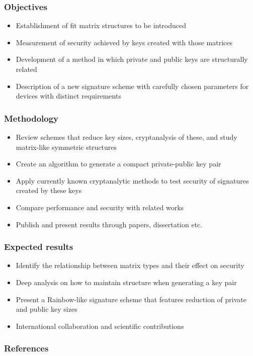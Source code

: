 \documentclass[12pt]{beamer}
\newcommand{\backupbegin}{
  \newcounter{framenumberappendix}
  \setcounter{framenumberappendix}{\value{framenumber}}
}
\newcommand{\backupend}{
  \addtocounter{framenumberappendix}{-\value{framenumber}}
  \addtocounter{framenumber}{\value{framenumberappendix}}
}
\begin{document}
\begin{frame}
  \frametitle{Objectives}
  \begin{itemize}
    \item Establishment of fit matrix structures to be introduced
    \item Measurement of security achieved by keys created with those matrices
    \item Development of a method in which private and public keys are
        structurally related
    \item Description of a new signature scheme with carefully chosen
        parameters for devices with distinct requirements
  \end{itemize}
\end{frame}

\begin{frame}
  \frametitle{Methodology}
  \begin{itemize}
    \item Review schemes that reduce key sizes, cryptanalysis of these, and
        study matrix-like symmetric structures
    \item Create an algorithm to generate a compact private-public key
        pair
    \item Apply currently known cryptanalytic methods to test security of
        signatures created by these keys
    \item Compare performance and security with related works
    \item Publish and present results through papers, dissertation etc.
  \end{itemize}
\end{frame}

\begin{frame}
  \frametitle{Expected results}
  \begin{itemize}
    \item Identify the relationship between matrix types and their effect on
        security
    \item Deep analysis on how to maintain structure when generating a key pair
    \item Present a Rainbow-like signature scheme that features reduction of
        private and public key sizes
    \item International collaboration and scientific contributions
  \end{itemize}
\end{frame}

\backupbegin
\begin{frame}
  \frametitle{References}
  
  {\tiny }
\end{frame}
\backupend
\end{document}
